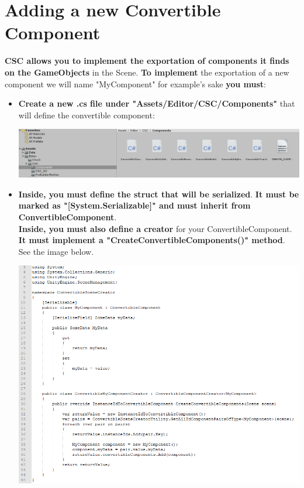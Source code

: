 \documentclass[10pt,a4paper]{article}
\begin{document}
\section{Adding a new Convertible Component}
\textbf{CSC allows you to implement the exportation of components it finds on the GameObjects} in the Scene. \textbf{To implement} the exportation of a new component we will name "MyComponent" for example's sake \textbf{you must}:
\begin{itemize}
\item \textbf{Create a new .cs file under "Assets/Editor/CSC/Components"} that will define the convertible component:
\begin{center}
\includegraphics[scale=0.5]{newComponentLocation}
\end{center}
\item \textbf{Inside, you must define the struct that will be serialized}. \textbf{It must be marked as "[System.Serializable]" and must inherit from ConvertibleComponent}.\\
\textbf{Inside, you must also define a creator} for your ConvertibleComponent. \textbf{It must implement a "CreateConvertibleComponents()" method}. See the image below.
\begin{center}
\includegraphics[scale=0.75]{newComponentDeclaration}
\end{center}

\end{itemize}
\end{document}
